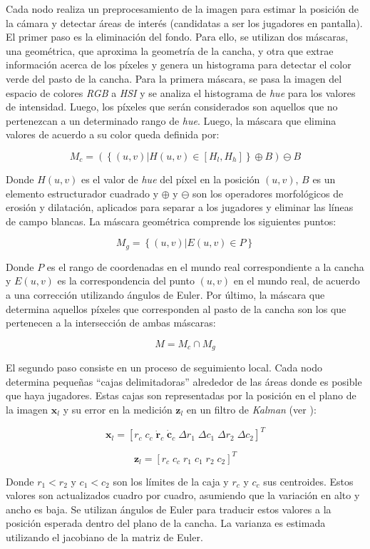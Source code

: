 Cada nodo realiza un preprocesamiento de la imagen para estimar la posición
de la cámara y detectar áreas de interés (candidatas a ser los jugadores en
pantalla). El primer paso es la eliminación del fondo. Para ello, se utilizan dos máscaras,
una geométrica, que aproxima la geometría de la cancha, y otra que extrae
información acerca de los píxeles y genera un histograma para detectar el color
verde del pasto de la cancha. Para la primera máscara, se pasa la imagen del
espacio de colores
\textit{RGB} a \textit{HSI} y se analiza el histograma de \textit{hue} para los
valores de intensidad. Luego, los píxeles que serán considerados son
aquellos que no pertenezcan a un determinado rango de \textit{hue}.
Luego, la máscara que elimina valores de acuerdo a su color queda definida por:

\[
  M_c = (\left\{(u, v) | H(u, v) \in [H_l, H_h]\right\} \oplus B ) \ominus B
\]

Donde $H(u, v)$ es el valor de \textit{hue} del píxel en la posición $(u, v)$,
$B$ es un elemento estructurador cuadrado y $\oplus$ y $\ominus$ son los
operadores morfológicos de erosión y dilatación, aplicados para separar a los
jugadores y eliminar las líneas de campo blancas. La máscara geométrica
comprende los siguientes puntos:

\[
  M_g = \left\{ (u, v) | E(u, v)  \in P \right\}
\]

Donde $P$ es el rango de coordenadas en el mundo real correspondiente a la cancha
y $E(u, v)$ es la correspondencia del punto $(u, v)$ en el mundo real, de
acuerdo a una corrección utilizando ángulos de Euler. Por último, la máscara que
determina aquellos píxeles que corresponden al pasto de la cancha son los que
pertenecen a la intersección de ambas máscaras:

\[
  M = M_c \cap M_g
\]

El segundo paso consiste en un proceso de seguimiento local. Cada nodo
determina pequeñas ``cajas delimitadoras'' alrededor de las áreas donde
es posible que haya jugadores. Estas cajas son
representadas por la posición en el plano de la imagen $\mathbf{x}_l$ y su
error en la medición $\mathbf{z}_l$ en un filtro de \textit{Kalman} (ver \cite{funk2003study}):

\[
\mathbf{x}_l = [r_c \; c_c \;  \mathbf{\dot r}_c  \; \mathbf{\dot c}_c \;  \Delta r_1  \; \Delta c_1 \;  \Delta r_2 \;  \Delta c_2]^T
\]

\[
\mathbf{z}_l = [r_c \;  c_c  \; r_1  \; c_1  \; r_2  \; c_2]^T
\]

Donde $r_1 < r_2$ y $c_1 < c_2$ son los límites de la caja y
$r_c$ y $c_c$ sus centroides. Estos valores son
actualizados cuadro por cuadro, asumiendo que la variación en alto y ancho es
baja. Se utilizan ángulos de Euler para traducir estos valores a la posición
esperada dentro del plano de la cancha. La varianza es estimada utilizando el
jacobiano de la matriz de Euler.

